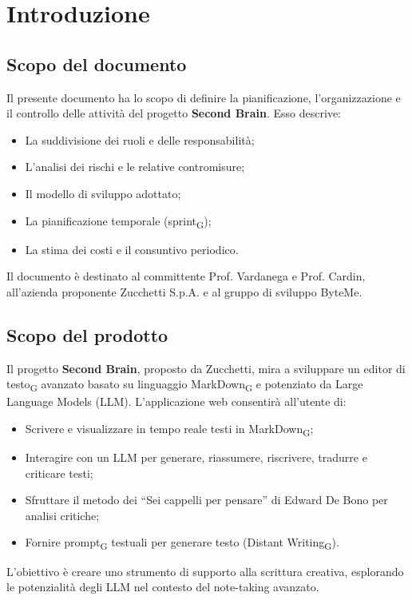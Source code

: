 \documentclass[11pt,a4paper]{article}
\newcommand{\gls}[1]{#1\textsubscript{G}}
\begin{document}
\newpage

\tableofcontents
\thispagestyle{empty}
\newpage

\setcounter{page}{1}

\section{Introduzione}
\subsection{Scopo del documento}
Il presente documento ha lo scopo di definire la pianificazione, l’organizzazione e il controllo delle attività del progetto \textbf{Second Brain}. Esso descrive:
\begin{itemize}
    \item La suddivisione dei ruoli e delle responsabilità;
    \item L’analisi dei rischi e le relative contromisure;
    \item Il modello di sviluppo adottato;
    \item La pianificazione temporale (\gls{sprint});
    \item La stima dei costi e il consuntivo periodico.
\end{itemize}
Il documento è destinato al committente Prof. Vardanega e Prof. Cardin, all'azienda proponente Zucchetti S.p.A. e al gruppo di sviluppo ByteMe.

\subsection{Scopo del prodotto}
Il progetto \textbf{Second Brain}, proposto da Zucchetti, mira a sviluppare un \gls{editor di testo} avanzato basato su linguaggio \gls{MarkDown} e potenziato da Large Language Models (LLM). L’applicazione web consentirà all’utente di:
\begin{itemize}
    \item Scrivere e visualizzare in tempo reale testi in \gls{MarkDown};
    \item Interagire con un LLM per generare, riassumere, riscrivere, tradurre e criticare testi;
    \item Sfruttare il metodo dei “Sei cappelli per pensare” di Edward De Bono per analisi critiche;
    \item Fornire \gls{prompt} testuali per generare testo (\gls{Distant Writing}).
\end{itemize}
L’obiettivo è creare uno strumento di supporto alla scrittura creativa, esplorando le potenzialità degli LLM nel contesto del note-taking avanzato.
\end{document}
